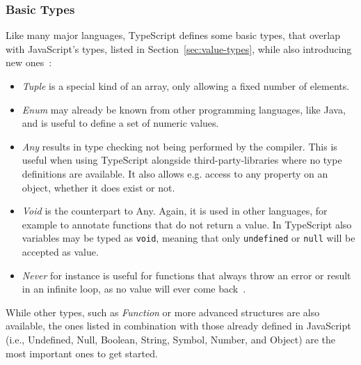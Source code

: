 
\subsubsection{Basic Types}
\label{sec:ts-basic-types}

Like many major languages, TypeScript defines some basic types, that overlap with JavaScript's types, listed in Section~\ref{sec:value-types}, while also introducing new ones~\cite{TypeScriptHandbook:BasicTypes}:
\begin{itemize}
  \item \emph{Tuple} is a special kind of an array, only allowing a fixed number of elements.
  \item \emph{Enum} may already be known from other programming languages, like Java, and is useful to define a set of numeric values.
  \item \emph{Any} results in type checking not being performed by the compiler. This is useful when using TypeScript alongside third-party-libraries where no type definitions are available. It also allows e.g. access to any property on an object, whether it does exist or not.
  \item \emph{Void} is the counterpart to Any. Again, it is used in other languages, for example to annotate functions that do not return a value. In TypeScript also variables may be typed as \texttt{void}, meaning that only \texttt{undefined} or \texttt{null} will be accepted as value.
  \item \emph{Never} for instance is useful for functions that always throw an error or result in an infinite loop, as no value will ever come back~\cite{TypeScriptHandbook:BasicTypes}.
\end{itemize}
While other types, such as \emph{Function} or more advanced structures are also available, the ones listed in combination with those already defined in JavaScript (i.e., Undefined, Null, Boolean, String, Symbol, Number, and Object) are the most important ones to get started.


